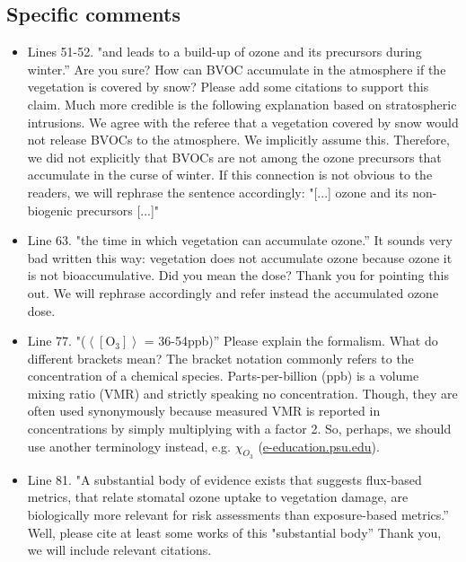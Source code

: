 \documentclass{scrartcl}
\begin{document}
\subsection*{Specific comments} 
\begin{itemize}
    
\item {\color{blue}Lines 51-52. "and leads to a build-up of ozone and its precursors during winter.” Are you sure? How can BVOC accumulate in the atmosphere if the vegetation is covered by snow? Please add some citations to support this claim. Much more credible is the following explanation based on stratospheric intrusions.}
We agree with the referee that a vegetation covered by snow would not release BVOCs to the atmosphere. We implicitly assume this. Therefore, we did not explicitly that BVOCs are not among the ozone precursors that accumulate in the curse of winter. If this connection is not obvious to the readers, we will rephrase the sentence accordingly: "[...] ozone and its non-biogenic precursors [...]"

\item {\color{blue}Line 63. "the time in which vegetation can accumulate ozone.” 
It sounds very bad written this way: vegetation does not accumulate ozone because ozone it is not bioaccumulative. Did you mean the dose?}
Thank you for pointing this out. We will rephrase accordingly and refer instead the accumulated ozone dose.

\item {\color{blue}Line 77. "($\left<[\mathrm{O_3}]\right>$ = 36-54ppb)” Please explain the formalism. What do different brackets mean?} The bracket notation commonly refers to the concentration of a chemical species. Parts-per-billion (ppb) is a volume mixing ratio (VMR) and strictly speaking no concentration. Though, they are often used synonymously because measured VMR is reported in concentrations by simply multiplying with a factor 2. So, perhaps, we should use another terminology instead, e.g. $\chi_{O_3}$ (\href{https://www.e-education.psu.edu/meteo300/node/534}{e-education.psu.edu}).

\item {\color{blue}Line 81. "A substantial body of evidence exists that suggests flux-based metrics, that relate stomatal ozone uptake to vegetation damage, are biologically more relevant for risk assessments than exposure-based metrics.” 
Well, please cite at least some works of this "substantial body”} Thank you, we will include relevant citations.


\end{itemize}
\end{document}
